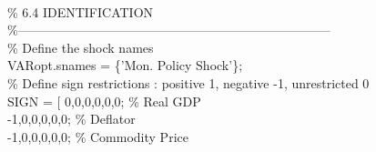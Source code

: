 \hspace{1mm}\hspace{5mm} \hspace{5mm} \hspace{5mm}  \\ 
\hspace{1mm}\hspace{5mm} \hspace{5mm} \hspace{5mm} \textcolor{matlabgreen}{\% 6.4 IDENTIFICATION }\\ 
\hspace{1mm}\hspace{5mm} \hspace{5mm} \hspace{5mm} \textcolor{matlabgreen}{\%--------------------------------------------------------------------------  }\\ 
\hspace{1mm}\hspace{5mm} \hspace{5mm} \hspace{5mm} \textcolor{matlabgreen}{\% Define the shock names }\\ 
\hspace{1mm}\hspace{5mm} \hspace{5mm} \hspace{5mm} VARopt.snames = \{\textcolor{matlabpurple}{'Mon. Policy Shock'}\}; \\ 
\hspace{1mm}\hspace{5mm} \hspace{5mm} \hspace{5mm} \textcolor{matlabgreen}{\% Define sign restrictions : positive 1, negative -1, unrestricted 0 }\\ 
\hspace{1mm}\hspace{5mm} \hspace{5mm} \hspace{5mm} SIGN = [ 0,0,0,0,0,0;  \textcolor{matlabgreen}{\% Real GDP }\\ 
\hspace{1mm}\hspace{5mm} \hspace{5mm} \hspace{5mm} -1,0,0,0,0,0;  \textcolor{matlabgreen}{\% Deflator }\\ 
\hspace{1mm}\hspace{5mm} \hspace{5mm} \hspace{5mm} -1,0,0,0,0,0;  \textcolor{matlabgreen}{\% Commodity Price }\\ 
